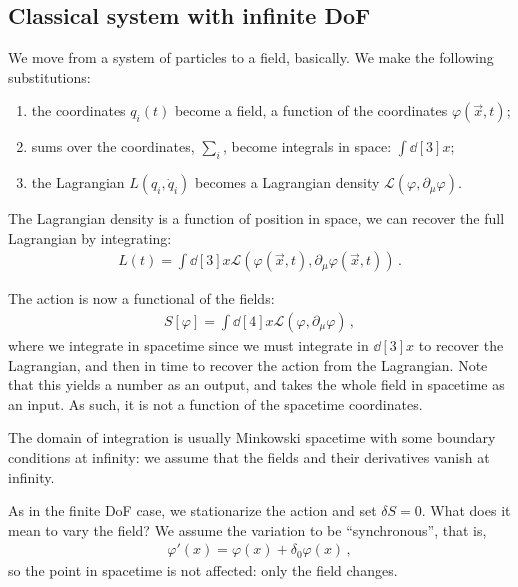 \documentclass[main.tex]{subfiles}
\begin{document}
\subsection{Classical system with infinite DoF}


We move from a system of particles to a field, basically. We make the following substitutions: 
\begin{enumerate}
    \item the coordinates \(q_{i}(t)\) become a field, a function of the coordinates \(\varphi (\vec{x}, t)\);
    \item sums over the coordinates, \(\sum _{i}\), become integrals in space: \(\int \dd[3]{x}\);
    \item the Lagrangian \(L(q_{i}, \dot{q}_{i})\) becomes a Lagrangian density \(\mathscr{L} (\varphi , \partial_{\mu } \varphi )\).  
\end{enumerate}

The Lagrangian density is a function of position in space, we can recover the full Lagrangian by integrating: 
%
\begin{align}
L(t) = \int \dd[3]{x} \mathscr{L}(\varphi (\vec{x}, t), \partial_{\mu } \varphi (\vec{x}, t)) 
\,.
\end{align}

The action is now a functional of the fields: 
%
\begin{align}
S [ \varphi ] = \int \dd[4]{x} \mathscr{L} (\varphi, \partial_{\mu } \varphi )
\,,
\end{align}
%
where we integrate in spacetime since we must integrate in \(\dd[3]{x}\) to recover the Lagrangian, and then in time to recover the action from the Lagrangian. 
Note that this yields a number as an output, and takes the whole field in spacetime as an input. As such, it is not a function of the spacetime coordinates.

The domain of integration is usually Minkowski spacetime with some boundary conditions at infinity: we assume that the fields and their derivatives vanish at infinity. 

As in the finite DoF case, we stationarize the action and set \(\delta S =0\). 
What does it mean to vary the field? We assume the variation to be ``synchronous'', that is, 
%
\begin{align}
\varphi '(x) = \varphi (x) + \delta_0 \varphi (x)
\,,
\end{align}
%
so the point in spacetime is not affected: only the field changes.
\end{document}
